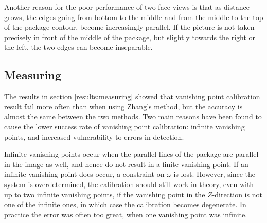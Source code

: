 Another reason for the poor performance of two-face views is that as distance grows, the edges going from bottom to the middle and from the middle to the top of the package contour, become increasingly parallel. 
If the picture is not taken precisely in front of the middle of the package, but slightly towards the right or the left, the two edges can become inseparable.




\subsection{Measuring}
The results in section \ref{results:measuring} showed that vanishing point calibration result fail more often than when using Zhang's method, but the accuracy is almost the same between the two methods. %
Two main reasons have been found to cause the lower success rate of vanishing point calibration: infinite vanishing points, and increased vulnerability to errors in detection.

Infinite vanishing points occur when the parallel lines of the package are parallel in the image as well, and hence do not result in a finite vanishing point. 
If an infinite vanishing point does occur, a constraint on $\omega$ is lost.
However, since the system is overdetermined, the calibration should still work in theory, even with up to two infinite vanishing points, if the vanishing point in the $Z$-direction is not one of the infinite ones, in which case the calibration becomes degenerate.
In practice the error was often too great, when one vanishing point was infinite. %

